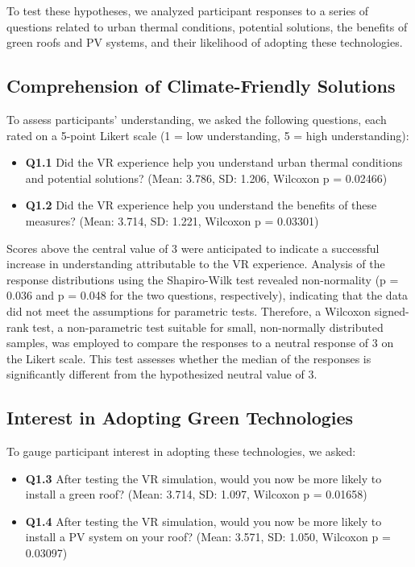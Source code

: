 \documentclass[draft, final]{vutinfth} %
\begin{document}
To test these hypotheses, we analyzed participant responses to a series of questions related to urban thermal conditions, potential solutions, the benefits of green roofs and PV systems, and their likelihood of adopting these technologies. 

\subsection{Comprehension of Climate-Friendly Solutions}

To assess participants' understanding, we asked the following questions, each rated on a 5-point Likert scale (1 = low understanding, 5 = high understanding):

\begin{itemize}
    \item \textbf{Q1.1} Did the VR experience help you understand urban thermal conditions and potential solutions? (Mean: 3.786, SD: 1.206, Wilcoxon p = 0.02466)
    \item \textbf{Q1.2} Did the VR experience help you understand the benefits of these measures? (Mean: 3.714, SD: 1.221, Wilcoxon p = 0.03301)
\end{itemize}

Scores above the central value of 3 were anticipated to indicate a successful increase in understanding attributable to the VR experience. Analysis of the response distributions using the Shapiro-Wilk test revealed non-normality (p = 0.036 and p = 0.048 for the two questions, respectively), indicating that the data did not meet the assumptions for parametric tests. Therefore, a Wilcoxon signed-rank test, a non-parametric test suitable for small, non-normally distributed samples, was employed to compare the responses to a neutral response of 3 on the Likert scale. This test assesses whether the median of the responses is significantly different from the hypothesized neutral value of 3.

\subsection{Interest in Adopting Green Technologies}

To gauge participant interest in adopting these technologies, we asked:

\begin{itemize}
    \item \textbf{Q1.3} After testing the VR simulation, would you now be more likely to install a green roof? (Mean: 3.714, SD: 1.097, Wilcoxon p = 0.01658)
    \item \textbf{Q1.4} After testing the VR simulation, would you now be more likely to install a PV system on your roof? (Mean: 3.571, SD: 1.050, Wilcoxon p = 0.03097)
\end{itemize}
\end{document}
